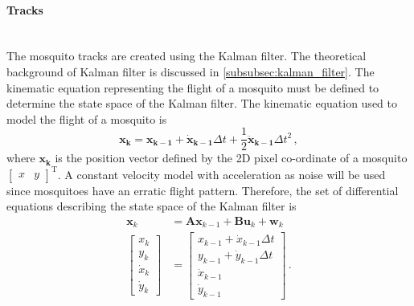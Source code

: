 \paragraph{Tracks}\mbox{}\\
The mosquito tracks are created using the Kalman filter. The theoretical background of Kalman filter is discussed in \autoref{subsubsec:kalman_filter}. The kinematic equation representing the flight of a mosquito must be defined to determine the state space of the Kalman filter. The kinematic equation used to model the flight of a mosquito is
\begin{equation}
    \mathbf{x_{k} = x_{k-1} + \dot{x}_{k-1}}\Delta t + \frac{1}{2}\mathbf{\ddot{{x}}_{k-1}}\Delta t^2\,,
\end{equation}
where $\mathbf{x_{k}}$ is the position vector defined by the 2D pixel co-ordinate of a mosquito $\begin{bmatrix} x & y \end{bmatrix}^\mathrm{T}$. A constant velocity model with acceleration as noise will be used since mosquitoes have an erratic flight pattern. Therefore, the set of differential equations describing the state space of the Kalman filter is
\begin{equation}
    \begin{aligned}
        \mathbf{x}_k
         & = \mathbf{Ax}_{k-1} + \mathbf{Bu}_k + \mathbf{w}_k \\
        \begin{bmatrix}
            x_k       \\
            y_k       \\
            \dot{x}_k \\
            \dot{y}_k
        \end{bmatrix}
         & =
        \begin{bmatrix}
            x_{k-1}+\dot{x}_{k-1} \Delta t \\
            y_{k-1}+\dot{y}_{k-1} \Delta t \\
            \dot{x}_{k-1}                  \\
            \dot{y}_{k-1}
        \end{bmatrix}\,.
    \end{aligned}
\end{equation}


